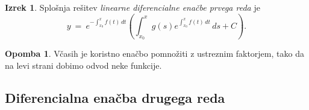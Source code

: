 \documentclass[11pt]{article}
\theoremstyle{definition}
\theoremstyle{definition}
\theoremstyle{definition}
\newtheorem{izrek}{Izrek}[section]
\theoremstyle{theorem}
\newtheorem*{opomba}{Opomba}
\begin{document}
\begin{izrek}

Splošnja rešitev \textit{linearne diferencialne enačbe prvega reda} je
$$y ~=~ e^{-\int_{x_0}^x f(t)\,dt} \left( \int_{x_0}^x g(s) e^{\int_{x_0}^x f(t)\,dt}\,ds + C \right).$$

\end{izrek}
\vspace{0.5cm}

\begin{opomba}

Včasih je koristno enačbo pomnožiti z ustreznim faktorjem, tako da na levi strani dobimo odvod neke funkcije.

\end{opomba}
\vspace{0.5cm}


\subsection{Diferencialna enačba drugega reda}
\vspace{0.5cm}


\pagebreak

\end{document}
